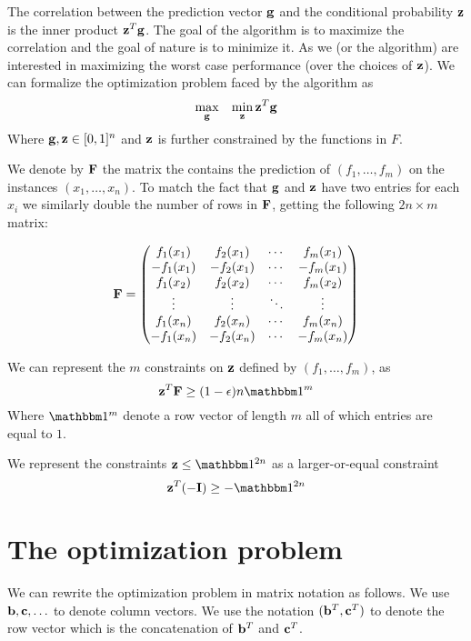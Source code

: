 \documentclass{article}[12pt]
\begin{document}
The correlation between the prediction vector $\mathbf{g}$ and the
conditional probability $\mathbf{z}$ is the inner product $\mathbf{z}^T \mathbf{g}$. The
goal of the algorithm is to maximize the correlation and the goal of
nature is to minimize it. As we (or the algorithm) are interested in
maximizing the worst case performance (over the choices of $\mathbf{z}$). We
can formalize the optimization problem faced by the algorithm as
\[
\max_{\mathbf{g}}\;\;\; \min_{\mathbf{z}} \mathbf{z}^T \mathbf{g}
\]
Where $\mathbf{g},\mathbf{z} \in [0,1]^n$ and $\mathbf{z}$ is further constrained by the
functions in $F$.

We denote by $\mathbf{F}$ the matrix the contains the prediction of
$(f_1,\ldots,f_m)$ on the instances $(x_1,\ldots,x_n)$. To match the
fact that $\mathbf{g}$ and $\mathbf{z}$ have two entries for each $x_i$ we similarly
double the number of rows in $\mathbf{F}$, getting the following $2n \times
m$ matrix:

\begin{equation}
\mathbf{F} = 
 \begin{pmatrix}
   f_1(x_1) &  f_2(x_1) & \cdots &  f_m(x_1) \\
  -f_1(x_1) & -f_2(x_1) & \cdots & -f_m(x_1) \\
   f_1(x_2) &  f_2(x_2) & \cdots &  f_m(x_2) \\
   \vdots   & \vdots    & \ddots &  \vdots  \\
   f_1(x_n)  &  f_2(x_n)  & \cdots &   f_m(x_n) \\
  -f_1(x_n)  & -f_2(x_n)  & \cdots &  -f_m(x_n) 
 \end{pmatrix}
\end{equation}

We can represent the $m$ constraints on $\mathbf{z}$ defined by
$(f_1,\ldots,f_m)$, as
\[
\vz^T \vF \geq (1-\epsilon)n \ones{m}
\]
Where $\ones{m}$ denote a row vector of length $m$ all of which
entries are equal to $1$.

We represent the constraints $\vz \leq \ones{2n}$ as a larger-or-equal
constraint
\[
\vz^T (-\vI) \geq -\ones{2n}
\] 

\newpage

\section{The optimization problem}

We can rewrite the optimization problem in matrix notation as follows.
We use $\mathbf{b},\mathbf{c},\ldots$ to denote column vectors.  We use the notation
$(\mathbf{b}^T,\mathbf{c}^T)$ to denote the row vector which is the concatenation of
$\mathbf{b}^T$ and $\mathbf{c}^T$.
\end{document}
